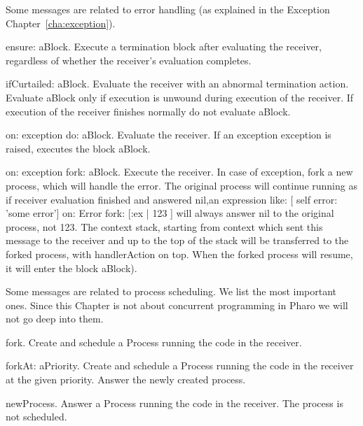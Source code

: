\documentclass[a4paper,10pt,twoside]{book}
\begin{document}
Some messages are related to error handling (as explained in the Exception Chapter~\ref{cha:exception}).

\begin{description}
\item{\textsf{ensure: aBlock}}. Execute a termination block after evaluating the receiver, regardless of whether the receiver's evaluation completes.
\item{\textsf{ifCurtailed: aBlock}}. Evaluate the receiver with an abnormal termination action. Evaluate aBlock only if execution is unwound during execution of the receiver. If execution of the receiver finishes normally do not evaluate aBlock.

\item{\textsf{on: exception do: aBlock}}. Evaluate the receiver. If an exception \textsf{exception} is raised, executes the block \textsf{aBlock}.

\item{\textsf{on: exception fork: aBlock}}. Execute the receiver. In case of exception, fork a new process, which will handle the error. The original process will continue running as if receiver evaluation finished and answered nil,\ie  an expression like: \textsf{[ self error: 'some error'] on: Error fork: [:ex |  123 ]} will always answer nil to the original process, not 123. The context stack, starting from context which sent this message to the receiver and up to the top of the stack will be transferred to the forked process, with handlerAction on top. When the forked process will resume, it will enter the block \textsf{aBlock}).
\end{description}


Some messages are related to process scheduling. We list the most important ones. Since this Chapter is not about concurrent programming in Pharo we will not go deep into them.

\begin{description}
\item{\textsf{fork}}. Create and schedule a Process running the code in the receiver.

\item{\textsf{forkAt: aPriority}}. Create and schedule a Process running the code in the receiver at the given priority. Answer the newly created process.

\item{\textsf{newProcess}}. Answer a Process running the code in the receiver. The process is not scheduled.
\end{description}
\end{document}
